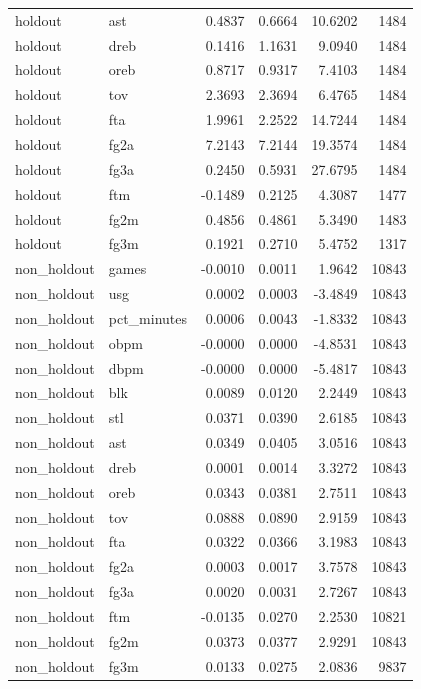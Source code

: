 \begin{table}
\begin{tabular}{llrrrr}
holdout & ast & 0.4837 & 0.6664 & 10.6202 & 1484 \\
holdout & dreb & 0.1416 & 1.1631 & 9.0940 & 1484 \\
holdout & oreb & 0.8717 & 0.9317 & 7.4103 & 1484 \\
holdout & tov & 2.3693 & 2.3694 & 6.4765 & 1484 \\
holdout & fta & 1.9961 & 2.2522 & 14.7244 & 1484 \\
holdout & fg2a & 7.2143 & 7.2144 & 19.3574 & 1484 \\
holdout & fg3a & 0.2450 & 0.5931 & 27.6795 & 1484 \\
holdout & ftm & -0.1489 & 0.2125 & 4.3087 & 1477 \\
holdout & fg2m & 0.4856 & 0.4861 & 5.3490 & 1483 \\
holdout & fg3m & 0.1921 & 0.2710 & 5.4752 & 1317 \\
non\_holdout & games & -0.0010 & 0.0011 & 1.9642 & 10843 \\
non\_holdout & usg & 0.0002 & 0.0003 & -3.4849 & 10843 \\
non\_holdout & pct\_minutes & 0.0006 & 0.0043 & -1.8332 & 10843 \\
non\_holdout & obpm & -0.0000 & 0.0000 & -4.8531 & 10843 \\
non\_holdout & dbpm & -0.0000 & 0.0000 & -5.4817 & 10843 \\
non\_holdout & blk & 0.0089 & 0.0120 & 2.2449 & 10843 \\
non\_holdout & stl & 0.0371 & 0.0390 & 2.6185 & 10843 \\
non\_holdout & ast & 0.0349 & 0.0405 & 3.0516 & 10843 \\
non\_holdout & dreb & 0.0001 & 0.0014 & 3.3272 & 10843 \\
non\_holdout & oreb & 0.0343 & 0.0381 & 2.7511 & 10843 \\
non\_holdout & tov & 0.0888 & 0.0890 & 2.9159 & 10843 \\
non\_holdout & fta & 0.0322 & 0.0366 & 3.1983 & 10843 \\
non\_holdout & fg2a & 0.0003 & 0.0017 & 3.7578 & 10843 \\
non\_holdout & fg3a & 0.0020 & 0.0031 & 2.7267 & 10843 \\
non\_holdout & ftm & -0.0135 & 0.0270 & 2.2530 & 10821 \\
non\_holdout & fg2m & 0.0373 & 0.0377 & 2.9291 & 10843 \\
non\_holdout & fg3m & 0.0133 & 0.0275 & 2.0836 & 9837 \\
\bottomrule
\end{tabular}
\end{table}
